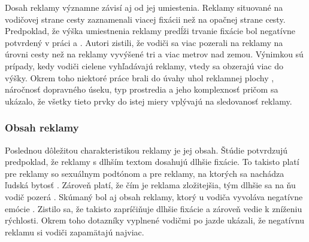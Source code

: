 Dosah reklamy významne závisí aj od jej umiestenia. Reklamy situované na vodičovej strane cesty zaznamenali viacej fixácii než na opačnej strane cesty. Predpoklad, že výška umiestnenia reklamy predĺži trvanie fixácie bol negatívne potvrdený v práci \cite{costa} a \cite{crundall}. Autori zistili, že vodiči sa viac pozerali na reklamy na úrovni cesty než na reklamy vyvýšené tri a viac metrov nad zemou. Výnimkou sú prípady, kedy vodiči cielene vyhľadávajú reklamy, vtedy sa obzerajú viac do výšky. Okrem toho niektoré práce brali do úvahy uhol reklamnej plochy \cite{zalesinska2018impact}, náročnosť dopravného úseku, typ prostredia a jeho komplexnosť \cite{costa, mollu2018driving} pričom sa ukázalo, že všetky tieto prvky do istej miery vplývajú na sledovanosť reklamy.

\subsubsection{Obsah reklamy}

Poslednou dôležitou charakteristikou reklamy je jej obsah. Štúdie \cite{harasimczuk2021longer, meuleners2020identifying} potvrdzujú predpoklad, že reklamy s dlhším textom dosahujú dlhšie fixácie. To takisto platí pre reklamy so sexuálnym podtónom \cite{MaliszewskiNorbert2019Iosa} a pre reklamy, na ktorých sa nachádza ľudská bytosť \cite{tarnowski2017roadside}. Zároveň platí, že čím je reklama zložitejšia, tým dlhšie sa na ňu vodič pozerá \cite{marciano2017effect}. Skúmaný bol aj obsah reklamy, ktorý u vodiča vyvoláva negatívne emócie \cite{chan2013emotional}. Zistilo sa, že takisto zapríčiňuje dlhšie fixácie a zároveň vedie k zníženiu rýchlosti. Okrem toho dotazníky vyplnené vodičmi po jazde ukázali, že negatívnu reklamu si vodiči zapamätajú najviac.

